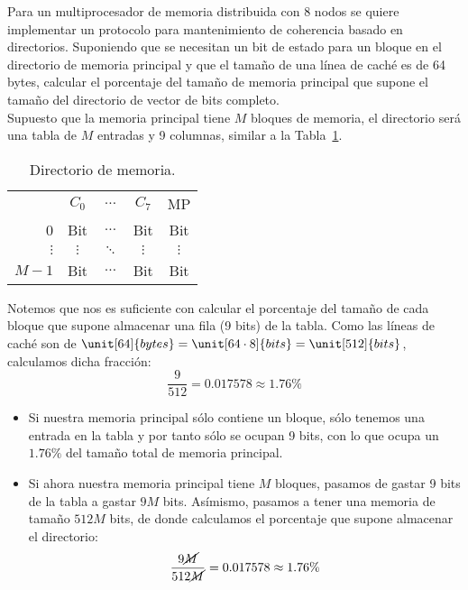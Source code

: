 \begin{ejercicio}
    Para un multiprocesador de memoria distribuida con $8$ nodos se quiere implementar un protocolo para mantenimiento de coherencia basado en directorios. Suponiendo que se necesitan un bit de estado para un bloque en el directorio de memoria principal y que el tamaño de una línea de caché es de 64 bytes, calcular el porcentaje del tamaño de memoria principal que supone el tamaño del directorio de vector de bits completo.\\

Supuesto que la memoria principal tiene $M$ bloques de memoria, el directorio será una tabla de $M$ entradas y 9 columnas, similar a la Tabla~\ref{tab:ej_rel3_2}.
\begin{table}[H]
\centering
\begin{tabular}{r|c|c|c|c|}
    & $C_0$ & $\ldots$ & $C_7$ & MP \\
    \cline{2-5}
    0 & Bit & $\ldots$ & Bit & Bit \\
    \cline{2-5}
    $\vdots$ & $\vdots$ & $\ddots$ & $\vdots$ & $\vdots$ \\
    \cline{2-5}
    $M-1$ & Bit & $\ldots$ & Bit & Bit \\
    \cline{2-5}
\end{tabular}
\caption{Directorio de memoria.}
\label{tab:ej_rel3_2}
\end{table}

Notemos que nos es suficiente con calcular el porcentaje del tamaño de cada bloque que supone almacenar una fila (9 bits) de la tabla. Como las líneas de caché son de $\unit[64]{bytes}= \unit[64\cdot 8]{bits} = \unit[512]{bits}$, calculamos dicha fracción:
\begin{equation*}
    \dfrac{9}{512} = 0.017578 \approx 1.76\%
\end{equation*}
\begin{itemize}
    \item Si nuestra memoria principal sólo contiene un bloque, sólo tenemos una entrada en la tabla y por tanto sólo se ocupan 9 bits, con lo que ocupa un $1.76\%$ del tamaño total de memoria principal.
    \item Si ahora nuestra memoria principal tiene $M$ bloques, pasamos de gastar 9 bits de la tabla a gastar $9M$ bits. Asímismo, pasamos a tener una memoria de tamaño $512M$ bits, de donde calculamos el porcentaje que supone almacenar el directorio:
        \begin{equation*}
            \dfrac{9\cancel{M}}{512\cancel{M}} = 0.017578 \approx 1.76\%
        \end{equation*}
\end{itemize}

\end{ejercicio}

